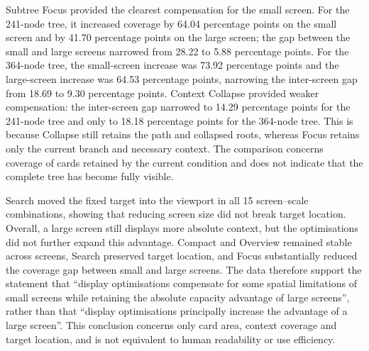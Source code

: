 Subtree Focus provided the clearest compensation for the small screen. For the 241-node tree, it increased coverage by 64.04 percentage points on the small screen and by 41.70 percentage points on the large screen; the gap between the small and large screens narrowed from 28.22 to 5.88 percentage points. For the 364-node tree, the small-screen increase was 73.92 percentage points and the large-screen increase was 64.53 percentage points, narrowing the inter-screen gap from 18.69 to 9.30 percentage points. Context Collapse provided weaker compensation: the inter-screen gap narrowed to 14.29 percentage points for the 241-node tree and only to 18.18 percentage points for the 364-node tree. This is because Collapse still retains the path and collapsed roots, whereas Focus retains only the current branch and necessary context. The comparison concerns coverage of cards retained by the current condition and does not indicate that the complete tree has become fully visible.

Search moved the fixed target into the viewport in all 15 screen--scale combinations, showing that reducing screen size did not break target location. Overall, a large screen still displays more absolute context, but the optimisations did not further expand this advantage. Compact and Overview remained stable across screens, Search preserved target location, and Focus substantially reduced the coverage gap between small and large screens. The data therefore support the statement that ``display optimisations compensate for some spatial limitations of small screens while retaining the absolute capacity advantage of large screens'', rather than that ``display optimisations principally increase the advantage of a large screen''. This conclusion concerns only card area, context coverage and target location, and is not equivalent to human readability or use efficiency.
